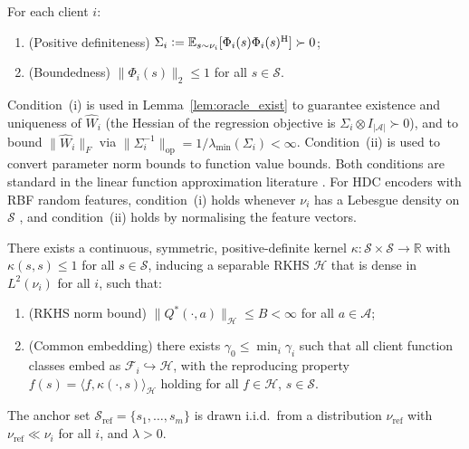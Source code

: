 \begin{assumption}
\label{assum:feature_cov}
For each client $i$:
\begin{enumerate}[label=(\roman*)]
    \item \textup{(Positive definiteness)}
    $\Sigma_i \vcentcolon= \mathbb{E}_{s\sim\nu_i}
    [\Phi_i(s)\Phi_i(s)^{\mathrm{H}}]
    \succ 0$;
    \item \textup{(Boundedness)}
    $\|\Phi_i(s)\|_2 \leq 1$
    for all $s \in \mathcal{S}$.
\end{enumerate}
Condition~(i) is used in Lemma~\ref{lem:oracle_exist} to guarantee
existence and uniqueness of $\hat{W}_i$
(the Hessian of the regression objective is
$\Sigma_i \otimes I_{|\mathcal{A}|} \succ 0$),
and to bound
$\|\hat{W}_i\|_F$ via
$\|\Sigma_i^{-1}\|_{\mathrm{op}}
= 1/\lambda_{\min}(\Sigma_i) < \infty$.
Condition~(ii) is used to convert
parameter norm bounds to function value bounds.
Both conditions are standard in the linear
function approximation literature \citep{tsitsiklis1997analysis,bhandari2018finite}.
For HDC encoders with RBF random features,
condition~(i) holds whenever $\nu_i$ has a
Lebesgue density on $\mathcal{S}$
\citep{rahimi2007random}, and condition~(ii)
holds by normalising the feature vectors.

\end{assumption}


\begin{assumption}
\label{assum:common_rkhs}
There exists a continuous, symmetric, positive-definite kernel
$\kappa:\mathcal{S}\times\mathcal{S}\to\mathbb{R}$ with
$\kappa(s,s)\leq 1$ for all $s\in\mathcal{S}$, inducing a
separable RKHS $\mathcal{H}$ that is dense in $L^2(\nu_i)$
for all $i$, such that:
\begin{enumerate}[label=\textup{(\roman*)}]
    \item \textup{(RKHS norm bound)}
    $\|Q^*(\cdot,a)\|_{\mathcal{H}}\leq B < \infty$
    for all $a\in\mathcal{A}$;
    \item \textup{(Common embedding)}
    there exists $\gamma_0\leq\min_i\gamma_i$ such that
    all client function classes embed as
    $\mathcal{F}_i\hookrightarrow\mathcal{H}$,
    with the reproducing property
    $f(s)=\langle f,\kappa(\cdot,s)\rangle_{\mathcal{H}}$
    holding for all $f\in\mathcal{H}$, $s\in\mathcal{S}$.
\end{enumerate}
\end{assumption}

\begin{assumption}
\label{assum:anchor}
The anchor set $\mathcal{S}_{\mathrm{ref}}=\{s_1,\ldots,s_m\}$
is drawn i.i.d.\ from a distribution $\nu_{\mathrm{ref}}$ with
$\nu_{\mathrm{ref}}\ll\nu_i$ for all $i$, and $\lambda>0$.
\end{assumption}


